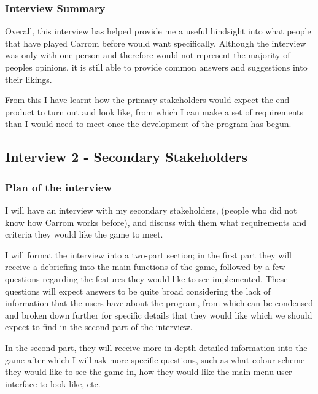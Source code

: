 \documentclass[11pt,a4paper]{report}
\begin{document}
\subsubsection{Interview Summary}
Overall, this interview has helped provide me a useful hindsight into what people that have played Carrom before would want specifically. Although the interview was only with one person and therefore would not represent the majority of peoples opinions, it is still able to provide common answers and suggestions into their likings. \newline

From this I have learnt how the primary stakeholders would expect the end product to turn out and look like, from which I can make a set of requirements than I would need to meet once the development of the program has begun.






\subsection{Interview 2 - Secondary Stakeholders}

\subsubsection{Plan of the interview}
I will have an interview with my secondary stakeholders, (people who did not know how Carrom works before), and discuss with them what requirements and criteria they would like the game to meet. \newline

\noindent I will format the interview into a two-part section; in the first part they will receive a debriefing into the main functions of the game, followed by a few questions regarding the features they would like to see implemented. These questions will expect answers to be quite broad considering the lack of information that the users have about the program, from which can be condensed and broken down further for specific details that they would like which we should expect to find in the second part of the interview.

In the second part, they will receive more in-depth detailed information into the game after which I will ask more specific questions, such as what colour scheme they would like to see the game in, how they would like the main menu user interface to look like, etc. \newline
\end{document}
